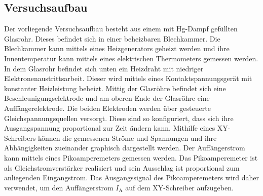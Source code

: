 \subsection{Versuchsaufbau}
\label{sec:Versuchsaufbau}
Der vorliegende Versuchsaufbau besteht aus einem mit Hg-Dampf gefüllten Glasrohr.
Dieses befindet sich in einer beheizbaren Blechkammer. Die Blechkammer kann mittels eines Heizgenerators geheizt werden und ihre Innentemperatur kann mittels eines elektrischen Thermometers gemessen werden.
In dem Glasrohr befindet sich unten ein Heizdraht mit niedriger Elektronenaustrittsarbeit. Dieser wird mittels eines Kontaktspannungsgerät mit konstanter Heizleistung beheizt. Mittig der Glasröhre befindet sich eine Beschleunigungselektrode und am oberen Ende der Glasröhre eine Auffängerelektrode.
Die beiden Elektroden werden über gesteuerte Gleichspannungsquellen versorgt. Diese sind so konfiguriert, dass sich ihre Ausgangspannung proportional zur Zeit ändern kann.
Mithilfe eines XY-Schreibers können die gemessenen Ströme und Spannungen und ihre Abhängigkeiten zueinander graphisch dargestellt werden.
Der Auffängerstrom kann mittels eines Pikoamperemeters gemessen werden.
Das Pikoamperemeter ist als Gleichstromverstärker realisiert und sein Ausschlag ist proportional zum anliegenden Eingangstrom. Das Ausgangssignal des Pikoamperemeters wird daher verwendet, um den Auffängerstrom $I_\mathrm{A}$ auf dem XY-Schreiber aufzugeben.
